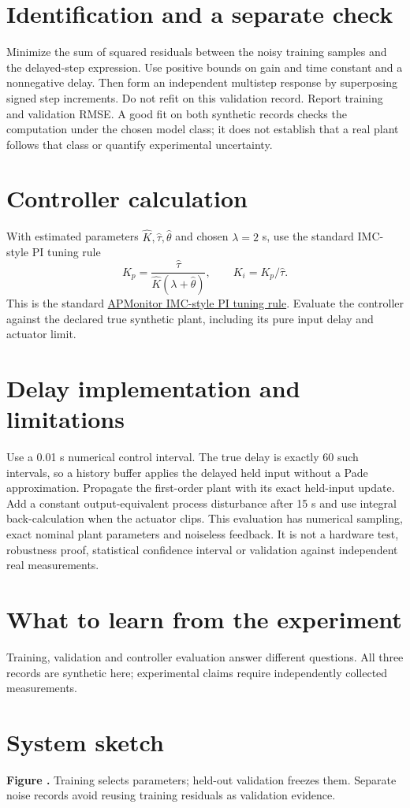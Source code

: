 \documentclass[10pt,a4paper]{article}
\begin{document}
\section{Identification and a separate check}
Minimize the sum of squared residuals between the noisy training samples and the delayed-step expression. Use positive bounds on gain and time constant and a nonnegative delay. Then form an independent multistep response by superposing signed step increments. Do not refit on this validation record.
Report training and validation RMSE. A good fit on both synthetic records checks the computation under the chosen model class; it does not establish that a real plant follows that class or quantify experimental uncertainty.
\section{Controller calculation}
With estimated parameters $\hat K,\hat\tau,\hat\theta$ and chosen $\lambda=2$ s, use the standard IMC-style PI tuning rule
\[K_p=\frac{\hat\tau}{\hat K(\lambda+\hat\theta)},\qquad K_i=K_p/\hat\tau.\]
This is the standard \href{https://apmonitor.com/pdc/index.php/Main/ProportionalIntegralControl}{APMonitor IMC-style PI tuning rule}. Evaluate the controller against the declared true synthetic plant, including its pure input delay and actuator limit.
\section{Delay implementation and limitations}
Use a 0.01 s numerical control interval. The true delay is exactly 60 such intervals, so a history buffer applies the delayed held input without a Pade approximation. Propagate the first-order plant with its exact held-input update. Add a constant output-equivalent process disturbance after 15 s and use integral back-calculation when the actuator clips.
This evaluation has numerical sampling, exact nominal plant parameters and noiseless feedback. It is not a hardware test, robustness proof, statistical confidence interval or validation against independent real measurements.
\section{What to learn from the experiment}
Training, validation and controller evaluation answer different questions. All three records are synthetic here; experimental claims require independently collected measurements.
\section{System sketch}
\begin{center}\resizebox{\ifdim\width>.98\linewidth.98\linewidth\else\width\fi}{!}{}
\par\small{}\label{fig:system}\textbf{Figure \thefigure.} Training selects parameters; held-out validation freezes them. Separate noise records avoid reusing training residuals as validation evidence.\end{center}
\newpage
\end{document}
